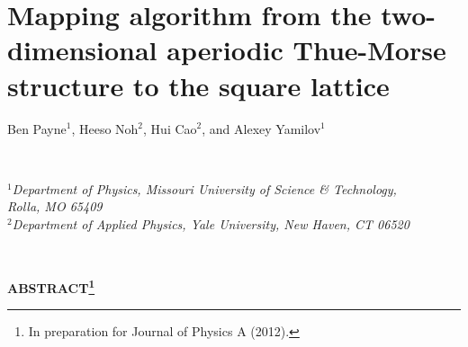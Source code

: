 % 
% 
% 
% 
% 
% 
% 
\chapter{Mapping algorithm from the two-dimensional aperiodic Thue-Morse structure to the square lattice}
\label{chap:TM_to_TB}
\label{paper:5_start}

\begin{center}
Ben Payne$^1$, Heeso Noh$^2$, Hui Cao$^2$, and Alexey Yamilov$^1$                                                                               \end{center}

\ \\
\begin{center}
\textit{$^1$Department of Physics, Missouri University of Science \& Technology,\\ Rolla, MO 65409\\
$^2$Department of Applied Physics, Yale University, New Haven, CT 06520}\end{center}

\ \\
% 
% 
\begin{center}\textbf{ABSTRACT\footnote{In preparation for Journal of Physics A (2012).}}        \end{center}

